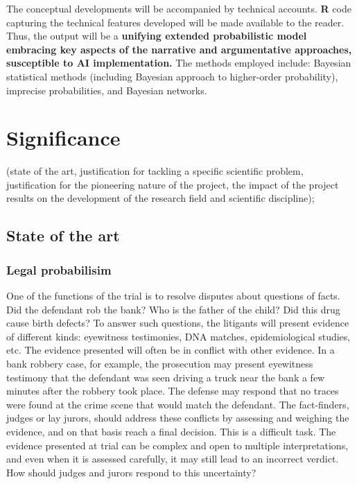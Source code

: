 \documentclass[11pt,dvipsnames,enabledeprecatedfontcommands]{scrartcl}
\begin{document}
The conceptual developments will be accompanied by technical accounts.
\textbf{\textsf{R}} code capturing the technical features developed will
be made available to the reader. Thus, the output will be a
\textbf{unifying extended probabilistic model embracing key aspects of the narrative and argumentative approaches, susceptible to AI implementation.}
The methods employed include: Bayesian statistical methods (including
Bayesian approach to higher-order probability), imprecise probabilities,
and Bayesian networks.

\hypertarget{significance}{%
\section{Significance}\label{significance}}

(state of the art, justification for tackling a specific scientific
problem, justification for the pioneering nature of the project, the
impact of the project results on the development of the research field
and scientific discipline);

\hypertarget{state-of-the-art}{%
\subsection{State of the art}\label{state-of-the-art}}

\hypertarget{legal-probabilisim}{%
\subsubsection{Legal probabilisim}\label{legal-probabilisim}}

One of the functions of the trial is to resolve disputes about questions
of facts. Did the defendant rob the bank? Who is the father of the
child? Did this drug cause birth defects? To answer such questions, the
litigants will present evidence of different kinds: eyewitness
testimonies, DNA matches, epidemiological studies, etc. The evidence
presented will often be in conflict with other evidence. In a bank
robbery case, for example, the prosecution may present eyewitness
testimony that the defendant was seen driving a truck near the bank a
few minutes after the robbery took place. The defense may respond that
no traces were found at the crime scene that would match the defendant.
The fact-finders, judges or lay jurors, should address these conflicts
by assessing and weighing the evidence, and on that basis reach a final
decision. This is a difficult task. The evidence presented at trial can
be complex and open to multiple interpretations, and even when it is
assessed carefully, it may still lead to an incorrect verdict. How
should judges and jurors respond to this uncertainty?
\end{document}
